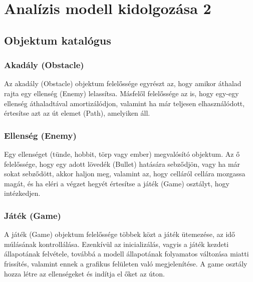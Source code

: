 %
\chapter{Analízis modell kidolgozása 2}

\thispagestyle{fancy}

\section{Objektum katalógus}


%



\subsection{Akadály (Obstacle)}
Az akadály (Obstacle) objektum felelőssége egyrészt az, hogy amikor áthalad rajta egy ellenség (Enemy) lelassítsa. Másfelől felelőssége az is, hogy egy-egy ellenség  áthaladtával amortizálódjon, valamint ha már teljesen elhasználódott, értesítse azt az út elemet (Path), amelyiken áll.
\subsection{Ellenség (Enemy)}
Egy ellenséget (tünde, hobbit, törp vagy ember) megvalósító objektum. Az ő felelőssége, hogy egy adott lövedék (Bullet) hatására sebződjön, vagy ha már sokat sebződött, akkor haljon meg, valamint az, hogy celláról cellára mozgassa magát, és ha eléri a végzet hegyét értesítse a játék (Game) osztályt, hogy intézkedjen.

\subsection{Játék (Game)}
A játék (Game) objektum felelőssége többek közt a játék ütemezése, az idő múlásának kontrollálása. Ezenkívül az inicializálás, vagyis a játék kezdeti állapotának felvétele, továbbá a modell állapotának folyamatos változása miatti frissítés, valamint ennek a grafikus felületen való megjelenítése. A game osztály hozza létre az ellenségeket és indítja el őket az úton.

